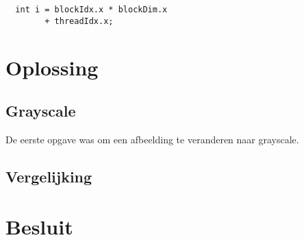 \documentclass[10pt, twocolumn, a4paper]{article}
\begin{document}
\begin{verbatim}
  int i = blockIdx.x * blockDim.x 
		+ threadIdx.x;
\end{verbatim}

\section{Oplossing}
\subsection{Grayscale}
De eerste opgave was om een afbeelding te veranderen naar grayscale.

\subsection{Vergelijking}
\section{Besluit}

\onecolumn

\appendix
\inputminted[tabsize=4,obeytabs]{c}{labo2.c}

\end{document}
